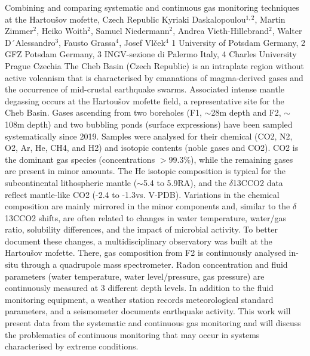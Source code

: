 \begin{conf-abstract}
{Combining and comparing systematic and continuous gas monitoring techniques at the Hartoušov mofette, Czech Republic}
{Kyriaki Daskalopoulou$^{1,2}$, Martin Zimmer$^{2}$, Heiko Woith$^{2}$, Samuel Niedermann$^{2}$, Andrea Vieth-Hillebrand$^{2}$, Walter D´Alessandro$^{3}$, Fausto Grassa$^{4}$, Josef Vlček$^{4}$}
{1 University of Potsdam Germany, 2 GFZ Potsdam Germany, 3 INGV-sezione di Palermo Italy, 4 Charles University Prague Czechia}
{The Cheb Basin (Czech Republic) is an intraplate region without active volcanism that is characterised by emanations of magma-derived gases and the occurrence of mid-crustal earthquake swarms. Associated intense mantle degassing occurs at the Hartoušov mofette field, a representative site for the Cheb Basin. Gases ascending from two boreholes (F1, $\sim$28m depth and F2, $\sim$108m depth) and two bubbling ponds (surface expressions) have been sampled systematically since 2019. Samples were analysed for their chemical (CO2, N2, O2, Ar, He, CH4, and H2) and isotopic contents (noble gases and CO2). CO2 is the dominant gas species (concentrations $>$99.3\%), while the remaining gases are present in minor amounts. The He isotopic composition is typical for the subcontinental lithospheric mantle ($\sim$5.4 to 5.9RA), and the $\delta$13CCO2 data reflect mantle-like CO2 (-2.4 to -1.3\permil vs. V-PDB). Variations in the chemical composition are mainly mirrored in the minor components and, similar to the $\delta$13CCO2 shifts, are often related to changes in water temperature, water/gas ratio, solubility differences, and the impact of microbial activity. To better document these changes, a multidisciplinary observatory was built at the Hartoušov mofette. There, gas composition from F2 is continuously analysed in-situ through a quadrupole mass spectrometer. Radon concentration and fluid parameters (water temperature, water level/pressure, gas pressure) are continuously measured at 3 different depth levels. In addition to the fluid monitoring equipment, a weather station records meteorological standard parameters, and a seismometer documents earthquake activity. This work will present data from the systematic and continuous gas monitoring and will discuss the problematics of continuous monitoring that may occur in systems characterised by extreme conditions.}
\end{conf-abstract}
